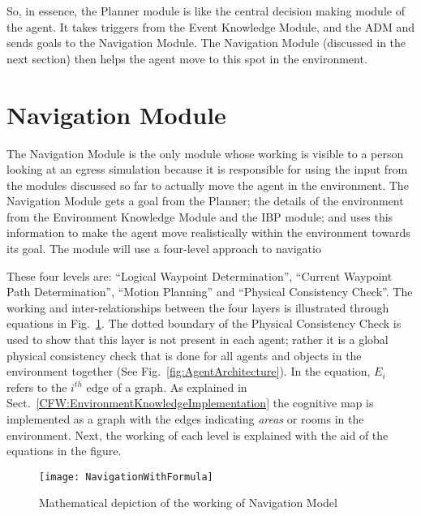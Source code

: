 So, in essence, the Planner module is like the central decision making module of the agent. It takes triggers from the Event Knowledge Module, and the ADM and sends goals to the Navigation Module. The Navigation Module (discussed in the next section) then helps the agent move to this spot in the environment.

\section{Navigation Module}
\label{CFW:NavigationModule}
The Navigation Module is the only module whose working is visible to a person looking at an egress simulation because it is responsible for using the input from the modules discussed so far to actually move the agent in the environment. The Navigation Module gets a goal from the Planner; the details of the environment from the Environment Knowledge Module and the IBP module; and uses this information to make the agent move realistically within the environment towards its goal. The module will use a four-level approach to navigatio

These four levels are: ``Logical Waypoint Determination'', ``Current Waypoint Path Determination'', ``Motion Planning'' and ``Physical Consistency Check''. The working and inter-relationships between the four layers is illustrated through equations in Fig.~\ref{fig:detailedNavigationModule}. The dotted boundary of the Physical Consistency Check is used to show that this layer is not present in each agent; rather it is a global physical consistency check that is done for all agents and objects in the environment together (See Fig.~\ref{fig:AgentArchitecture}). In the equation, $E_i$ refers to the $i^{th}$ edge of a graph. As explained in Sect.~\ref{CFW:EnvironmentKnowledgeImplementation} the cognitive map is implemented as a graph with the edges indicating \emph{areas} or rooms in the environment. Next, the working of each level is explained with the aid of the equations in the figure.

\begin{figure}[!tb]
\centering
\texttt{[image: NavigationWithFormula]}
\caption[Detailed Navigation Model]{Mathematical depiction of the working of Navigation Model}
\label{fig:detailedNavigationModule}
\end{figure}

